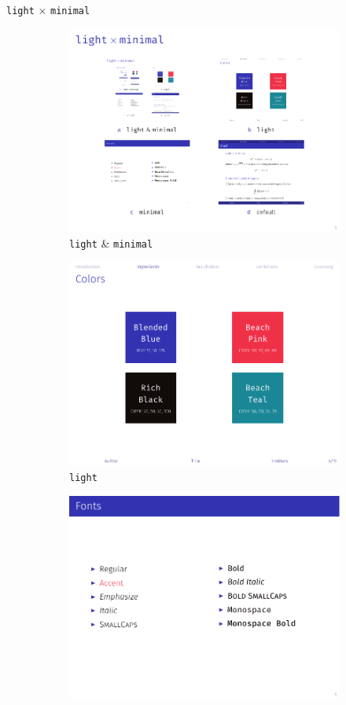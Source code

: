 \documentclass{beamer}%
\begin{document}
\begin{frame}{\texttt{light$\,\times\,$minimal}}
\begin{figure}[!ht]
\centering
\begin{subfigure}{.5\textwidth}
	\centering
	\includegraphics[width=.75\linewidth]{tutorial-style}
	\caption{\texttt{light} \& \texttt{minimal}}
	\label{fig:light-minimal}
\end{subfigure}%
\begin{subfigure}{.5\textwidth}
	\centering
	\includegraphics[width=.75\linewidth]{tutorial-light-color}
	\caption{\texttt{light}}
	\label{fig:light}
\end{subfigure}
\begin{subfigure}{.5\textwidth}
	\centering
	\includegraphics[width=.75\linewidth]{tutorial-minimal-font}

\end{subfigure}
\end{figure}
\end{frame}
\end{document}
